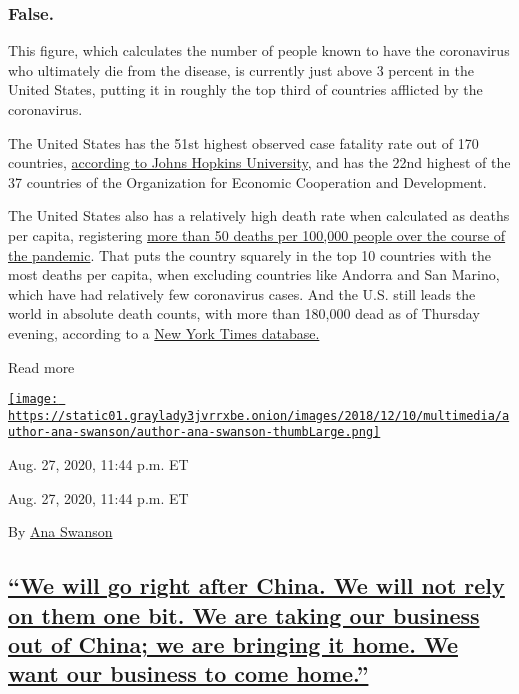 \hypertarget{false-}{%
\subsubsection{\texorpdfstring{\textbf{False.}
}{False. }}\label{false-}}

This figure, which calculates the number of people known to have the
coronavirus who ultimately die from the disease, is currently just above
3 percent in the United States, putting it in roughly the top third of
countries afflicted by the coronavirus.

The United States has the 51st highest observed case fatality rate out
of 170 countries,
\href{https://coronavirus.jhu.edu/data/mortality}{according to Johns
Hopkins University}, and has the 22nd highest of the 37 countries of the
Organization for Economic Cooperation and Development.

The United States also has a relatively high death rate when calculated
as deaths per capita, registering
\href{https://coronavirus.jhu.edu/data/mortality}{more than 50 deaths
per 100,000 people over the course of the pandemic}. That puts the
country squarely in the top 10 countries with the most deaths per
capita, when excluding countries like Andorra and San Marino, which have
had relatively few coronavirus cases. And the U.S. still leads the world
in absolute death counts, with more than 180,000 dead as of Thursday
evening, according to a
\href{https://www.nytimes3xbfgragh.onion/interactive/2020/world/coronavirus-maps.html}{New
York Times database.}

Read more

\href{https://www.nytimes3xbfgragh.onion/by/ana-swanson}{\texttt{[image: https://static01.graylady3jvrrxbe.onion/images/2018/12/10/multimedia/author-ana-swanson/author-ana-swanson-thumbLarge.png]}}

Aug. 27, 2020, 11:44 p.m. ET

Aug. 27, 2020, 11:44 p.m. ET

By \href{https://www.nytimes3xbfgragh.onion/by/ana-swanson}{Ana Swanson}

\hypertarget{we-will-go-right-after-china-we-will-not-rely-on-them-one-bit-we-are-taking-our-business-out-of-china-we-are-bringing-it-home-we-want-our-business-to-come-home}{%
\subsection{\texorpdfstring{\protect\hyperlink{we-will-go-right-after-china-we-will-not-rely-on-them-one-bit-we-are-taking-our-business-out-of-china-we-are-bringing-it-home-we}{``We
will go right after China. We will not rely on them one bit. We are
taking our business out of China; we are bringing it home. We want our
business to come
home.''}}{``We will go right after China. We will not rely on them one bit. We are taking our business out of China; we are bringing it home. We want our business to come home.''}}\label{we-will-go-right-after-china-we-will-not-rely-on-them-one-bit-we-are-taking-our-business-out-of-china-we-are-bringing-it-home-we-want-our-business-to-come-home}}

